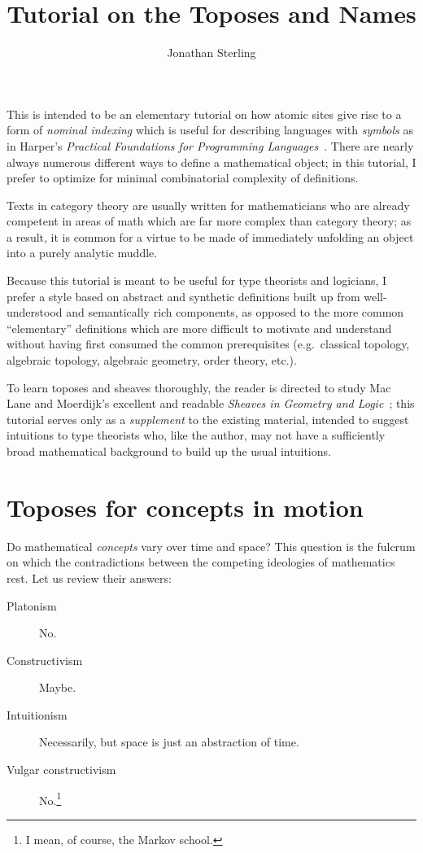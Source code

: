 \documentclass{article}
\title{Tutorial on the Toposes and Names}
\author{Jonathan Sterling}
\affil{Carnegie Mellon University}
\date{}
\begin{document}
\maketitle

This is intended to be an elementary tutorial on how atomic sites give
rise to a form of \emph{nominal indexing} which is useful for
describing languages with \emph{symbols} as in Harper's
\emph{Practical Foundations for Programming
  Languages}~\cite{harper:2016}. There are nearly always numerous
different ways to define a mathematical object; in this tutorial, I
prefer to optimize for minimal combinatorial complexity of
definitions.

Texts in category theory are usually written for mathematicians who
are already competent in areas of math which are far more complex than
category theory; as a result, it is common for a virtue to be
made of immediately unfolding an object into a purely analytic muddle.

Because this tutorial is meant to be useful for type theorists and
logicians, I prefer a style based on abstract and
synthetic definitions built up from well-understood and
semantically rich components, as opposed to the more common
``elementary'' definitions which are more difficult to motivate and
understand without having first consumed the common prerequisites
(e.g.\ classical topology, algebraic topology, algebraic geometry,
order theory, etc.).

To learn toposes and sheaves thoroughly, the reader is directed to
study Mac Lane and Moerdijk's excellent and readable \emph{Sheaves in
  Geometry and Logic}~\cite{maclane-moerdijk:1992}; this tutorial
serves only as a \emph{supplement} to the existing material, intended
to suggest intuitions to type theorists who, like the author, may not
have a sufficiently broad mathematical background to build up the
usual intuitions.


\section{Toposes for concepts in motion}

Do mathematical \emph{concepts} vary over time and space? This
question is the fulcrum on which the contradictions between the
competing ideologies of mathematics rest. Let us review their answers:
\begin{description}
\item[Platonism] No.
\item[Constructivism] Maybe.
\item[Intuitionism] Necessarily, but space is just an abstraction of
  time.
\item[Vulgar constructivism] No.\footnote{I mean, of course, the Markov school.}
\end{description}
\end{document}
